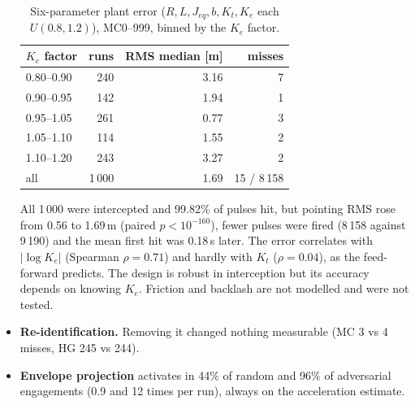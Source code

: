 \begin{itemize}
\begin{table}[H]
\centering\small
\caption{Six-parameter plant error ($R,L,J_{eq},b,K_t,K_e$ each $U(0.8,1.2)$), MC0--999, binned by the $K_e$ factor.}
\label{tab:pert6}
\begin{tabular}{@{}lrrr@{}}
\toprule
$K_e$ factor & runs & RMS median [m] & misses\\
\midrule
0.80--0.90 & 240 & 3.16 & 7\\
0.90--0.95 & 142 & 1.94 & 1\\
0.95--1.05 & 261 & 0.77 & 3\\
1.05--1.10 & 114 & 1.55 & 2\\
1.10--1.20 & 243 & 3.27 & 2\\
\midrule
all & 1\,000 & 1.69 & 15 / 8\,158\\
\bottomrule
\end{tabular}
\end{table}
All 1\,000 were intercepted and 99.82\% of pulses hit, but pointing RMS rose from 0.56 to 1.69\,m (paired $p<10^{-160}$), fewer pulses were fired (8\,158 against 9\,190) and the mean first hit was 0.18\,s later. The error correlates with $|\log K_e|$ (Spearman $\rho=0.71$) and hardly with $K_t$ ($\rho=0.04$), as the feed-forward predicts. The design is robust in interception but its accuracy depends on knowing $K_e$. Friction and backlash are not modelled and were not tested.
\item \textbf{Re-identification.} Removing it changed nothing measurable (MC 3 vs 4 misses, HG 245 vs 244).
\item \textbf{Envelope projection} activates in 44\% of random and 96\% of adversarial engagements (0.9 and 12 times per run), always on the acceleration estimate.
\end{itemize}

